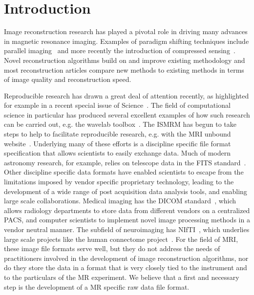 \documentclass[12pt]{article}
\begin{document}
\newpage
\clearpage
\onecolumn

\section*{Introduction}
Image reconstruction research has played a pivotal role in driving many advances in magnetic resonance imaging. Examples of paradigm shifting techniques include parallel imaging~\cite{Pruessmann:1999uq, Sodickson:1997fk, Griswold:2002kx}  and more recently the introduction of compressed sensing~\cite{Donoho:2006compressed, Lustig:2007vn}. Novel reconstruction algorithms build on and improve existing methodology and most reconstruction articles compare new methods to existing methods in terms of image quality and reconstruction speed.

Reproducible research has drawn a great deal of attention recently, as highlighted for example in a recent special issue of Science~\cite{Jasny:2011again, Peng:2011reproducible}. The field of computational science in particular has produced several excellent examples of how such research can be carried out, e.g. the wavelab toolbox~\cite{wavelab}.  The ISMRM has begun to take steps to help to facilitate reproducible research, e.g. with the MRI unbound website~\cite{mri_unbound}. Underlying many of these efforts is a discipline specific file format specification that allows scientists to easily exchange data.  Much of modern astronomy research, for example, relies on telescope data in the FITS standard~\cite{fits}.  Other discipline specific data formats have enabled scientists to escape from the limitations imposed by vendor specific proprietary technology, leading to the development of a wide range of post acquisition data analysis tools, and enabling large scale collaborations.  Medical imaging has the DICOM standard~\cite{dicom}, which allows radiology departments to store data from different vendors on a centralized PACS, and computer scientists to implement novel image processing methods in a vendor neutral manner. The subfield of neuroimaging has NIfTI~\cite{nifti}, which underlies large scale projects like the human connectome project~\cite{connectome}.  For the field of MRI, these image file formats serve well, but they do not address the needs of practitioners involved in the development of image reconstruction algorithms, nor do they store the data in a format that is very closely tied to the instrument and to the particulars of the MR experiment. We believe that a first and necessary step is the development of a MR specific raw data file format.
\end{document}
